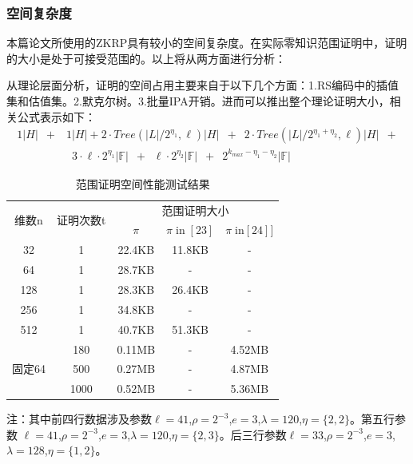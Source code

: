 \documentclass[zihao=-4]{ctexart}
\begin{document}
\subsubsection{空间复杂度}
本篇论文所使用的ZKRP具有较小的空间复杂度。在实际零知识范围证明中，证明的大小是处于可接受范围的。以上将从两方面进行分析：\par
从理论层面分析，证明的空间占用主要来自于以下几个方面：1.RS编码中的插值集和估值集。2.默克尔树。3.批量IPA开销。进而可以推出整个理论证明大小，相关公式表示如下：
\begin{equation}
  \begin{aligned}
  1|H|\enspace+&1|H|+ 2\cdot Tree(|L|/2^{\eta_1}, \ell)|H|\enspace + \enspace2\cdot Tree(|L|/2^{\eta_1+\eta_2}, \ell)|H| \enspace+\\
  &\enspace3\cdot \ell \cdot 2^{\eta_1}|\mathbb{F}|\enspace +\enspace \ell \cdot 2^{\eta_2}|\mathbb{F}|\enspace + \enspace2^{k_{max}-\eta_1-\eta_2}|\mathbb{F}|
  \end{aligned}
\end{equation}\par
\begin{table}[H] %
  \centering
  \caption{范围证明空间性能测试结果}
  \begin{threeparttable}
      \begin{tabular}{|c|c|c|c|c|}\hline
          \multirow{2}{*}{维数n} & \multirow{2}{*}{证明次数t}&\multicolumn{3}{c|}{范围证明大小}  \\ \cline{3-5}
          \multirow{2}{*}{} & \multirow{2}{*}{}& $\pi$ & $\pi \; \text{in} \;[23]$ & $\pi \; \text{in} [24]] $\\ \hline
          32 & 1 & 22.4KB & 11.8KB & -\\ \hline
           64 & 1 & 28.7KB & - & -\\ \hline
          128 & 1 & 28.3KB & 26.4KB & -\\ \hline
           256 & 1 & 34.8KB & - & -\\ \hline
           512 & 1 & 40.7KB & 51.3KB & -\\ \hline
          \multirow{3}{*}{固定64} & 180 & 0.11MB & - & 4.52MB \\ \cline{2-5}
          \multirow{3}{*}{} & 500 & 0.27MB & - & 4.87MB \\ \cline{2-5}
           \multirow{3}{*}{} & 1000 & 0.52MB & - & 5.36MB \\ \cline{1-5}
      \end{tabular}
      注：其中前四行数据涉及参数$\ell=41$,$\rho=2^{-3}$,$e=3$,$\lambda=120$,$\eta=\{2,2\}$。第五行参数
       $\ell=41$,$\rho=2^{-3}$,$e=3$,$\lambda=120$,$\eta=\{2,3\}$。后三行参数$\ell=33$,$\rho=2^{-3}$,$e=3$,$\lambda=128$,$\eta=\{1,2\}$。
  \end{threeparttable}
  \label{空间性能}
\end{table}
\end{document}
